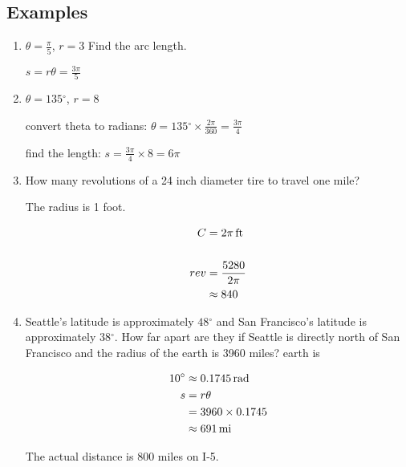 \documentclass{exam}
\newcommand{\dg}{\ensuremath{^\circ}}
\begin{document}
  \subsection{Examples}
  \begin{enumerate}
    \item $\theta = \frac{\pi}{5}$, $r = 3$  Find the arc length.
      \begin{solution}
        $s = r \theta = \frac{3 \pi}{5}$
      \end{solution}

    \item $\theta = 135 \dg$, $r = 8$
      \begin{solution}
        convert theta to radians: $\theta = 135 \dg \times \frac{2 \pi}{360} = \frac{3 \pi}{4}$

        find the length: $s = \frac{3 \pi}{4} \times 8 = 6 \pi$
      \end{solution}

    \item How many revolutions of a 24 inch diameter tire to travel one mile?
      \begin{solution}
        The radius is 1 foot.

        \begin{align*}
          C   & = \unit[2 \pi]{ft} \\
          \\
          rev & = \frac{5280}{2 \pi} \\
              & \approx 840 \\
        \end{align*}

      \end{solution}

    \item 
      Seattle's latitude is approximately $48 \dg$ and San Francisco's latitude is approximately $38 \dg$.  How far
      apart are they if Seattle is directly north of San Francisco and the radius of the earth is 3960 miles?
      earth is 

      \begin{solution}
        \begin{align*}
          10 \dg & \approx \unit[0.1745]{rad} \\
          s      & = r \theta \\
                 & = 3960 \times 0.1745 \\
                 & \approx \unit[691]{mi} \\
        \end{align*}

        The actual distance is 800 miles on I-5.

      \end{solution}

  \end{enumerate}
\end{document}
